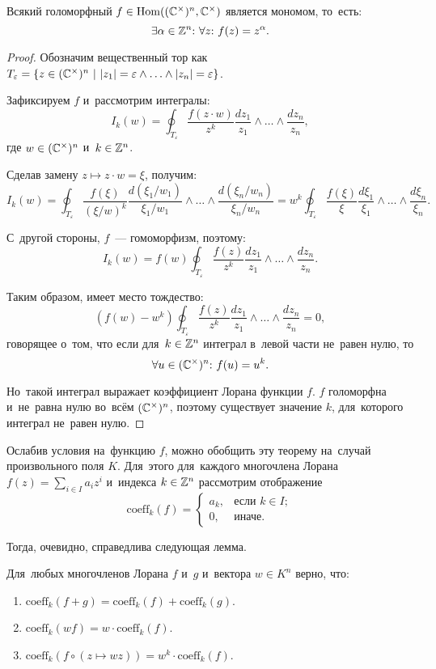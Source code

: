 \documentclass{article}
\begin{document}
\begin{lemma*}
    Всякий голоморфный $f \in \mathrm{Hom}((\mathbb{C}^\times)^n, \mathbb{C}^\times)$ является мономом, то~есть:
    $$
        \exists \alpha \in \mathbb{Z}^n{:}\ \forall z{:}\ f(z) = z^\alpha.
    $$
\end{lemma*}

\begin{proof}

Обозначим вещественный тор как $T_\varepsilon = \{ z \in (\mathbb{C}^\times)^n\ |\ |z_1| = \varepsilon \wedge \ldots \wedge |z_n| = \varepsilon \}$.

Зафиксируем $f$ и~рассмотрим интегралы:
$$
    I_k(w) = \oint_{T_\varepsilon} \frac{f(z \cdot w)}{z^k} \frac{dz_1}{z_1} \wedge \ldots \wedge \frac{dz_n}{z_n},
$$
где $w \in (\mathbb{C}^\times)^n$ и~$k \in \mathbb{Z}^n$.

Сделав замену $z \mapsto z \cdot w = \xi$, получим:
$$
    I_k(w) = \oint_{T_\varepsilon} \frac{f(\xi)}{(\xi / w)^k} \frac{d(\xi_1 / w_1)}{\xi_1 / w_1} \wedge \ldots \wedge \frac{d(\xi_n / w_n)}{\xi_n / w_n}
           = w^k \oint_{T_\varepsilon} \frac{f(\xi)}{\xi} \frac{d\xi_1}{\xi_1} \wedge \ldots \wedge \frac{d\xi_n}{\xi_n}.
$$

С~другой стороны, $f$~— гомоморфизм, поэтому:
$$
    I_k(w) = f(w) \oint_{T_\varepsilon} \frac{f(z)}{z^k} \frac{dz_1}{z_1} \wedge \ldots \wedge \frac{dz_n}{z_n}.
$$

Таким образом, имеет место тождество:
$$
    (f(w) - w^k) \oint_{T_\varepsilon} \frac{f(z)}{z^k} \frac{dz_1}{z_1} \wedge \ldots \wedge \frac{dz_n}{z_n} = 0,
$$
говорящее о~том, что если для~$k \in \mathbb{Z}^n$ интеграл в~левой части не~равен нулю, то
$$
    \forall u \in (\mathbb{C}^\times)^n{:}\ f(u) = u^k.
$$

Но~такой интеграл выражает коэффициент Лорана функции $f$. $f$ голоморфна и~не~равна нулю
во~всём $(\mathbb{C}^\times)^n$, поэтому существует значение $k$, для~которого интеграл не~равен нулю.

\end{proof}

Ослабив условия на~функцию $f$, можно обобщить эту теорему на~случай произвольного поля $K$.
Для~этого для~каждого многочлена Лорана $f(z) = \sum_{i \in I} a_i z^i$ и~индекса $k \in \mathbb{Z}^n$ рассмотрим отображение
$$
    \mathrm{coeff}_k(f) =
    \begin{cases}
        a_k, & \text{если $k \in I$}; \\
        0,   & \text{иначе.}
    \end{cases}
$$

Тогда, очевидно, справедлива следующая лемма.
\begin{lemma*}
    Для~любых многочленов Лорана $f$ и~$g$ и~вектора $w \in K^n$ верно, что:
    \begin{enumerate}
        \item $\mathrm{coeff}_k(f + g) = \mathrm{coeff}_k(f) + \mathrm{coeff}_k(g)$.
        \item $\mathrm{coeff}_k(w f) = w \cdot \mathrm{coeff}_k(f)$.
        \item $\mathrm{coeff}_k(f \circ (z \mapsto wz)) = w^k \cdot \mathrm{coeff}_k(f)$.
    \end{enumerate}
\end{lemma*}
\end{document}
